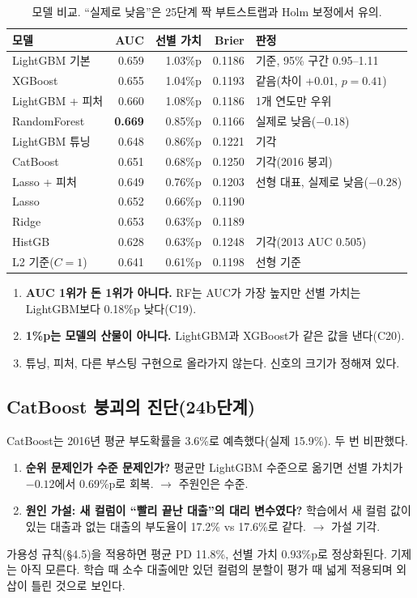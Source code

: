 \begin{table}[H]\centering\small
\begin{tabular}{@{}lrrrl@{}}\toprule
모델 & AUC & 선별 가치 & Brier & 판정\\\midrule
LightGBM 기본 & 0.659 & 1.03\%p & 0.1186 & 기준, 95\% 구간 0.95--1.11\\
XGBoost & 0.655 & 1.04\%p & 0.1193 & 같음(차이 +0.01, $p=0.41$)\\
LightGBM + 피처 & 0.660 & 1.08\%p & 0.1186 & 1개 연도만 우위\\
RandomForest & \textbf{0.669} & 0.85\%p & 0.1166 & 실제로 낮음($-0.18$)\\
LightGBM 튜닝 & 0.648 & 0.86\%p & 0.1221 & 기각\\
CatBoost & 0.651 & 0.68\%p & 0.1250 & 기각(2016 붕괴)\\
Lasso + 피처 & 0.649 & 0.76\%p & 0.1203 & 선형 대표, 실제로 낮음($-0.28$)\\
Lasso & 0.652 & 0.66\%p & 0.1190 & \\
Ridge & 0.653 & 0.63\%p & 0.1189 & \\
HistGB & 0.628 & 0.63\%p & 0.1248 & 기각(2013 AUC 0.505)\\
L2 기준($C=1$) & 0.641 & 0.61\%p & 0.1198 & 선형 기준\\\bottomrule
\end{tabular}
\caption{모델 비교. ``실제로 낮음''은 25단계 짝 부트스트랩과 Holm 보정에서 유의.}
\end{table}

\begin{keybox}[이 표에서 읽을 것]
\begin{enumerate}[leftmargin=*]
\item \textbf{AUC 1위가 돈 1위가 아니다.} RF는 AUC가 가장 높지만 선별 가치는 LightGBM보다 0.18\%p 낮다(C19).
\item \textbf{1\%p는 모델의 산물이 아니다.} LightGBM과 XGBoost가 같은 값을 낸다(C20).
\item 튜닝, 피처, 다른 부스팅 구현으로 올라가지 않는다. 신호의 크기가 정해져 있다.
\end{enumerate}
\end{keybox}

\subsection*{CatBoost 붕괴의 진단(24b단계)}
CatBoost는 2016년 평균 부도확률을 3.6\%로 예측했다(실제 15.9\%). 두 번 비판했다.
\begin{enumerate}[leftmargin=*]
\item \textbf{순위 문제인가 수준 문제인가?} 평균만 LightGBM 수준으로 옮기면 선별 가치가 $-0.12$에서 0.69\%p로 회복. \ensuremath{\to} 주원인은 수준.
\item \textbf{원인 가설: 새 컬럼이 ``빨리 끝난 대출''의 대리 변수였다?} 학습에서 새 컬럼 값이 있는 대출과 없는 대출의 부도율이 17.2\% vs 17.6\%로 같다. \ensuremath{\to} 가설 기각.
\end{enumerate}
가용성 규칙(\S4.5)을 적용하면 평균 PD 11.8\%, 선별 가치 0.93\%p로 정상화된다. 기제는 아직 모른다. 학습 때 소수 대출에만 있던 컬럼의 분할이 평가 때 넓게 적용되며 외삽이 틀린 것으로 보인다.

